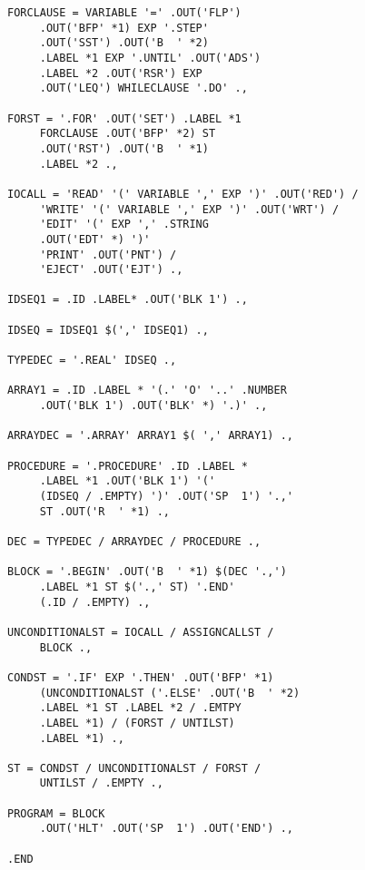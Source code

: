 \documentclass[notitlepage,twocolumn]{report}
\begin{document}
\begin{figure}
\begin{verbatim}
FORCLAUSE = VARIABLE '=' .OUT('FLP')
     .OUT('BFP' *1) EXP '.STEP'
     .OUT('SST') .OUT('B  ' *2)
     .LABEL *1 EXP '.UNTIL' .OUT('ADS')
     .LABEL *2 .OUT('RSR') EXP
     .OUT('LEQ') WHILECLAUSE '.DO' .,

FORST = '.FOR' .OUT('SET') .LABEL *1
     FORCLAUSE .OUT('BFP' *2) ST
     .OUT('RST') .OUT('B  ' *1)
     .LABEL *2 .,

IOCALL = 'READ' '(' VARIABLE ',' EXP ')' .OUT('RED') /
     'WRITE' '(' VARIABLE ',' EXP ')' .OUT('WRT') /
     'EDIT' '(' EXP ',' .STRING
     .OUT('EDT' *) ')'
     'PRINT' .OUT('PNT') /
     'EJECT' .OUT('EJT') .,

IDSEQ1 = .ID .LABEL* .OUT('BLK 1') .,

IDSEQ = IDSEQ1 $(',' IDSEQ1) .,

TYPEDEC = '.REAL' IDSEQ .,

ARRAY1 = .ID .LABEL * '(.' 'O' '..' .NUMBER
     .OUT('BLK 1') .OUT('BLK' *) '.)' .,

ARRAYDEC = '.ARRAY' ARRAY1 $( ',' ARRAY1) .,

PROCEDURE = '.PROCEDURE' .ID .LABEL *
     .LABEL *1 .OUT('BLK 1') '('
     (IDSEQ / .EMPTY) ')' .OUT('SP  1') '.,'
     ST .OUT('R  ' *1) .,

DEC = TYPEDEC / ARRAYDEC / PROCEDURE .,

BLOCK = '.BEGIN' .OUT('B  ' *1) $(DEC '.,')
     .LABEL *1 ST $('.,' ST) '.END'
     (.ID / .EMPTY) .,

UNCONDITIONALST = IOCALL / ASSIGNCALLST /
     BLOCK .,

CONDST = '.IF' EXP '.THEN' .OUT('BFP' *1)
     (UNCONDITIONALST ('.ELSE' .OUT('B  ' *2)
     .LABEL *1 ST .LABEL *2 / .EMTPY
     .LABEL *1) / (FORST / UNTILST)
     .LABEL *1) .,

ST = CONDST / UNCONDITIONALST / FORST /
     UNTILST / .EMPTY .,

PROGRAM = BLOCK
     .OUT('HLT' .OUT('SP  1') .OUT('END') .,

.END
\end{verbatim}
\end{figure}


\end{document}
